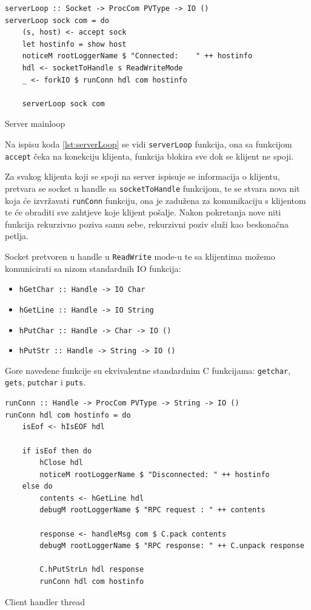 \begin{listing}[H]
\centering
\begin{verbatim}
serverLoop :: Socket -> ProcCom PVType -> IO ()
serverLoop sock com = do
    (s, host) <- accept sock
    let hostinfo = show host
    noticeM rootLoggerName $ "Connected:    " ++ hostinfo
    hdl <- socketToHandle s ReadWriteMode
    _ <- forkIO $ runConn hdl com hostinfo

    serverLoop sock com
\end{verbatim}
\caption{Server mainloop}
\label{lst:serverLoop}
\end{listing}

Na ispisu koda \ref{lst:serverLoop} se vidi \texttt{serverLoop}
funkcija, ona sa funkcijom \texttt{accept} čeka na konekciju
klijenta, funkcija blokira sve dok se klijent ne spoji.

Za svakog klijenta koji se spoji na server ispisuje se informacija o klijentu,
pretvara se socket u handle sa \texttt{socketToHandle} funkcijom,
te se stvara nova nit koja će izvržavati \texttt{runConn} funkciju,
ona je zadužena za komunikaciju s klijentom te će obraditi sve zahtjeve koje
klijent pošalje. Nakon pokretanja nove niti funkcija rekurzivno poziva samu
sebe, rekurzivni poziv služi kao beskonačna petlja.

Socket pretvoren u handle u \texttt{ReadWrite} mode-u te sa
klijentima možemo komunicirati sa nizom standardnih IO funkcija:

\begin{itemize}
    \item \texttt{hGetChar :: Handle -> IO Char}
    \item \texttt{hGetLine :: Handle -> IO String}
    \item \texttt{hPutChar :: Handle -> Char -> IO ()}
    \item \texttt{hPutStr  :: Handle -> String -> IO ()}
\end{itemize}

Gore navedene funkcije su ekvivalentne standardnim C funkcijama:
\texttt{getchar}, \texttt{gets},
\texttt{putchar} i \texttt{puts}.

\begin{listing}[H]
\centering
\begin{verbatim}
runConn :: Handle -> ProcCom PVType -> String -> IO ()
runConn hdl com hostinfo = do
    isEof <- hIsEOF hdl

    if isEof then do
        hClose hdl
        noticeM rootLoggerName $ "Disconnected: " ++ hostinfo
    else do
        contents <- hGetLine hdl
        debugM rootLoggerName $ "RPC request : " ++ contents

        response <- handleMsg com $ C.pack contents
        debugM rootLoggerName $ "RPC response: " ++ C.unpack response

        C.hPutStrLn hdl response
        runConn hdl com hostinfo
\end{verbatim}
\caption{Client handler thread}
\label{lst:client_handler}
\end{listing}

